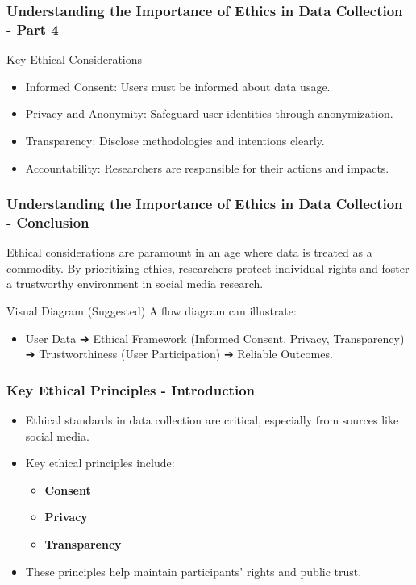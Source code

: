 \documentclass{beamer}
\begin{document}
\begin{frame}[fragile]
    \frametitle{Understanding the Importance of Ethics in Data Collection - Part 4}
    
    \begin{block}{Key Ethical Considerations}
        \begin{itemize}
            \item Informed Consent: Users must be informed about data usage.
            \item Privacy and Anonymity: Safeguard user identities through anonymization.
            \item Transparency: Disclose methodologies and intentions clearly.
            \item Accountability: Researchers are responsible for their actions and impacts.
        \end{itemize}
    \end{block}
\end{frame}

\begin{frame}[fragile]
    \frametitle{Understanding the Importance of Ethics in Data Collection - Conclusion}
    
    Ethical considerations are paramount in an age where data is treated as a commodity. By prioritizing ethics, researchers protect individual rights and foster a trustworthy environment in social media research.
    
    \begin{block}{Visual Diagram (Suggested)}
        A flow diagram can illustrate:
        \begin{itemize}
            \item User Data ➔ Ethical Framework (Informed Consent, Privacy, Transparency) ➔ Trustworthiness (User Participation) ➔ Reliable Outcomes.
        \end{itemize}
    \end{block}
\end{frame}

\begin{frame}[fragile]
    \frametitle{Key Ethical Principles - Introduction}
    \begin{itemize}
        \item Ethical standards in data collection are critical, especially from sources like social media.
        \item Key ethical principles include:
            \begin{itemize}
                \item \textbf{Consent}
                \item \textbf{Privacy}
                \item \textbf{Transparency}
            \end{itemize}
        \item These principles help maintain participants' rights and public trust.
    \end{itemize}
\end{frame}
\end{document}
